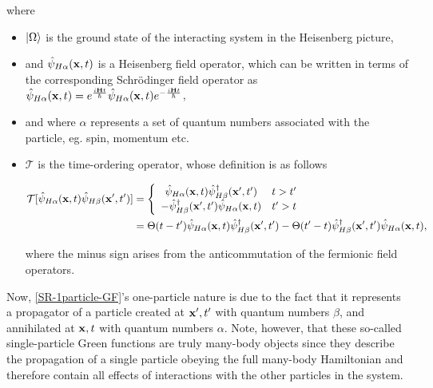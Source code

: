 \documentclass{homework}
\begin{document}
where \begin{itemize}
    \item $\ket{\Omega}$ is the ground state of the interacting system in the Heisenberg picture,
    \item and $\hat{\psi}_{H \alpha}({\bf x}, t)$ is a Heisenberg field operator, which can be written in terms of the corresponding Schr\"odinger field operator as $\hat{\psi}_{H \alpha}({\bf x}, t) = e^{\frac{i {\bf H} t}{\hbar}} \hat{\psi}_{H \alpha}({\bf x}, t) e^{-\frac{i {\bf H} t}{\hbar}}$, 
    \item and where $\alpha$ represents a set of quantum numbers associated with the particle, eg. spin, momentum etc. \item $\mathcal{T}$ is the time-ordering operator, whose definition is as follows 
    
    \begin{equation} \begin{split}
        \mathcal{T} [\hat{\psi}_{H \alpha}({\bf x}, t) \hat{\psi}_{H \beta}({\bf x}', t')] &= \left\{ \begin{array}{cc}
           \hat{\psi}_{H \alpha}({\bf x}, t) \hat{\psi}^\dagger_{H \beta}({\bf x}', t') & t > t' \\ 
           -  \hat{\psi}^\dagger_{H \beta}({\bf x}', t')   \hat{\psi}_{H \alpha}({\bf x}, t) & t' > t 
        \end{array}\right. \\
        &= \Theta(t-t')\hat{\psi}_{H \alpha}({\bf x}, t) \hat{\psi}^\dagger_{H \beta}({\bf x}', t') - \Theta(t'-t)\hat{\psi}^\dagger_{H \beta}({\bf x}', t')   \hat{\psi}_{H \alpha}({\bf x}, t),
    \end{split}
    \end{equation}
    
    where the minus sign arises from the anticommutation of the fermionic field operators. \\
\end{itemize}

Now, \cref{SR-1particle-GF}'s one-particle nature is due to the fact that it represents a propagator of a particle created at ${\bf x}', t'$ with quantum numbers $\beta$, and annihilated at ${\bf x}, t$ with quantum numbers $\alpha$. Note, however, that these so-called single-particle Green functions are truly many-body objects since they describe the propagation of a single particle obeying the full many-body Hamiltonian and therefore contain all effects of interactions with the other particles in the system. \\
\end{document}
